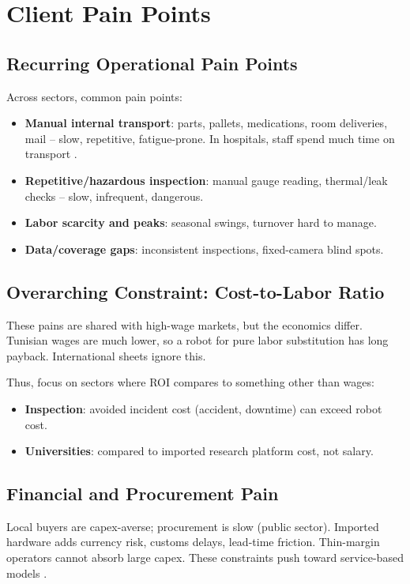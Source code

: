 \chapter{Client Pain Points}

\section{Recurring Operational Pain Points}

Across sectors, common pain points:
\begin{itemize}
    \item \textbf{Manual internal transport}: parts, pallets, medications, room deliveries, mail -- slow, repetitive, fatigue-prone. In hospitals, staff spend much time on transport \cite{researchgate_hospital,mir_healthcare}.
    \item \textbf{Repetitive/hazardous inspection}: manual gauge reading, thermal/leak checks -- slow, infrequent, dangerous.
    \item \textbf{Labor scarcity and peaks}: seasonal swings, turnover hard to manage.
    \item \textbf{Data/coverage gaps}: inconsistent inspections, fixed-camera blind spots.
\end{itemize}

\section{Overarching Constraint: Cost-to-Labor Ratio}

These pains are shared with high-wage markets, but the economics differ. Tunisian wages are much lower, so a robot for pure labor substitution has long payback. International sheets ignore this.

Thus, focus on sectors where ROI compares to something other than wages:
\begin{itemize}
    \item \textbf{Inspection}: avoided incident cost (accident, downtime) can exceed robot cost.
    \item \textbf{Universities}: compared to imported research platform cost, not salary.
\end{itemize}

\section{Financial and Procurement Pain}

Local buyers are capex-averse; procurement is slow (public sector). Imported hardware adds currency risk, customs delays, lead-time friction. Thin-margin operators cannot absorb large capex. These constraints push toward service-based models \cite{builtin_raas}.